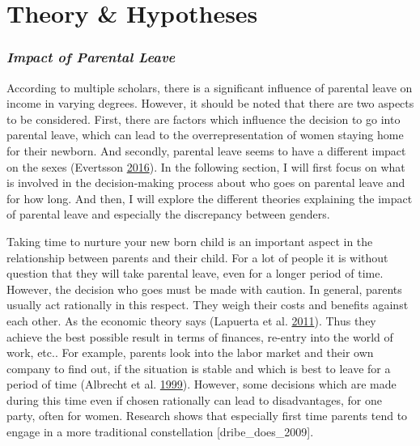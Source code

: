 \documentclass[
  12pt,
]{article}
\begin{document}
\hypertarget{theory-hypotheses}{%
\section{Theory \& Hypotheses}\label{theory-hypotheses}}

\hypertarget{impact-of-parental-leave}{%
\subsubsection*{\texorpdfstring{\emph{Impact of Parental Leave}}{Impact of Parental Leave}}\label{impact-of-parental-leave}}

According to multiple scholars, there is a significant influence of parental leave on income in varying degrees.
However, it should be noted that there are two aspects to be considered. First, there are factors which influence the decision to go into parental leave, which can lead to the overrepresentation of women staying home for their newborn. And secondly, parental leave seems to have a different impact on the sexes (Evertsson \protect\hyperlink{ref-evertsson_parental_2016}{2016}). In the following section, I will first focus on what is involved in the decision-making process about who goes on parental leave and for how long. And then, I will explore the different theories explaining the impact of parental leave and especially the discrepancy between genders.

Taking time to nurture your new born child is an important aspect in the relationship between parents and their child. For a lot of people it is without question that they will take parental leave, even for a longer period of time.
However, the decision who goes must be made with caution. In general, parents usually act rationally in this respect. They weigh their costs and benefits against each other. As the economic theory says (Lapuerta et al. \protect\hyperlink{ref-lapuerta_individual_2011}{2011}). Thus they achieve the best possible result in terms of finances, re-entry into the world of work, etc..
For example, parents look into the labor market and their own company to find out, if the situation is stable and which is best to leave for a period of time (Albrecht et al. \protect\hyperlink{ref-albrecht_career_1999}{1999}). However, some decisions which are made during this time even if chosen rationally can lead to disadvantages, for one party, often for women. Research shows that especially first time parents tend to engage in a more traditional constellation {[}dribe\_does\_2009{]}.
\end{document}
